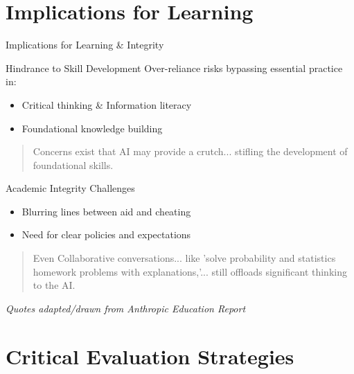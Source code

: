 \documentclass{beamer}
\begin{document}
\section{Implications for Learning}

\begin{frame}{Implications for Learning & Integrity}
\begin{block}{Hindrance to Skill Development}
Over-reliance risks bypassing essential practice in:
\begin{itemize}
    \item Critical thinking & Information literacy
    \item Foundational knowledge building
\end{itemize}
\blockquote{Concerns exist that AI may provide a crutch... stifling the development of foundational skills.}
\end{block}
\pause %
\begin{block}{Academic Integrity Challenges}
\begin{itemize}
    \item Blurring lines between aid and cheating
    \item Need for clear policies and expectations
\end{itemize}
\blockquote{Even Collaborative conversations... like 'solve probability and statistics homework problems with explanations,'... still offloads significant thinking to the AI.}
\end{block}
\footnotesize{\textit{Quotes adapted/drawn from Anthropic Education Report}}
\end{frame}

\section{Critical Evaluation Strategies}
\end{document}
